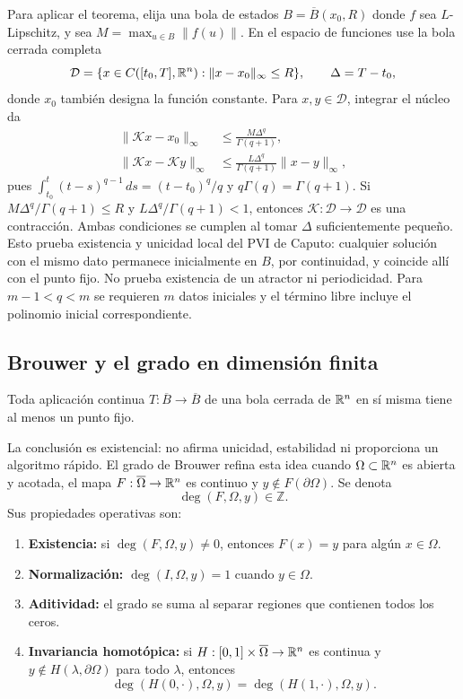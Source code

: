 Para aplicar el teorema, elija una bola de estados
\(B=\overline B(x_0,R)\) donde \(f\) sea \(L\)-Lipschitz, y sea
\(M=\max_{u\in B}\|f(u)\|\). En el espacio de funciones use la bola
cerrada completa
\[
 \mathcal D=\{x\in C([t_0,T],\mathbb{R}^n):\|x-x_0\|_\infty\le R\},
 \qquad \Delta=T-t_0,
\]
donde \(x_0\) también designa la función constante. Para \(x,y\in\mathcal D\),
integrar el núcleo da
\begin{align*}
 \|\mathcal Kx-x_0\|_\infty
 &\le\frac{M\Delta^q}{\Gamma(q+1)},\\
 \|\mathcal Kx-\mathcal Ky\|_\infty
 &\le\frac{L\Delta^q}{\Gamma(q+1)}\|x-y\|_\infty,
\end{align*}
pues \(\int_{t_0}^t(t-s)^{q-1}\,ds=(t-t_0)^q/q\) y
\(q\Gamma(q)=\Gamma(q+1)\). Si
\(M\Delta^q/\Gamma(q+1)\le R\) y
\(L\Delta^q/\Gamma(q+1)<1\), entonces
\(\mathcal K:\mathcal D\to\mathcal D\) es una contracción.
Ambas condiciones se cumplen al tomar \(\Delta\) suficientemente pequeño.
Esto prueba existencia y unicidad local del PVI de Caputo: cualquier solución
con el mismo dato permanece inicialmente en \(B\), por continuidad, y
coincide allí con el punto fijo. No prueba existencia de un atractor ni
periodicidad. Para
 \(m-1<q<m\) se requieren \(m\) datos iniciales y el término libre incluye el
 polinomio inicial correspondiente.

\subsection{Brouwer y el grado en dimensión finita}

\begin{proposition}
Toda aplicación continua $T:\overline B\to\overline B$ de una bola cerrada de
$\mathbb{R}^n$ en sí misma tiene al menos un punto fijo.
\end{proposition}

La conclusión es existencial: no afirma unicidad, estabilidad ni proporciona
un algoritmo rápido. El grado de Brouwer refina esta idea cuando
$\Omega\subset\mathbb{R}^n$ es abierta y acotada, el mapa
$F:\overline\Omega\to\mathbb{R}^n$ es continuo y
$y\notin F(\partial\Omega)$. Se denota
\[
 \deg(F,\Omega,y)\in\mathbb Z.
\]
Sus propiedades operativas son:

\begin{enumerate}
 \item \textbf{Existencia:} si $\deg(F,\Omega,y)\neq0$, entonces
 $F(x)=y$ para algún $x\in\Omega$.
 \item \textbf{Normalización:}
 $\deg(I,\Omega,y)=1$ cuando $y\in\Omega$.
 \item \textbf{Aditividad:} el grado se suma al separar regiones que contienen
 todos los ceros.
 \item \textbf{Invariancia homotópica:} si
 $H:[0,1]\times\overline\Omega\to\mathbb{R}^n$ es continua y
 $y\notin H(\lambda,\partial\Omega)$ para todo $\lambda$, entonces
 \begin{equation}
  \deg(H(0,\cdot),\Omega,y)
  =\deg(H(1,\cdot),\Omega,y).
  \label{eq:guide-degree-homotopy}
 \end{equation}
\end{enumerate}

